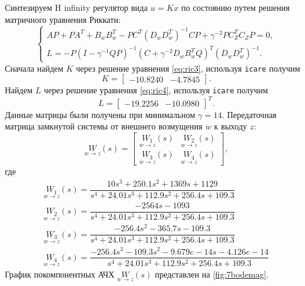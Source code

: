 Синтезируем H infinity регулятор вида $u=Kx$ по состоянию путем решения матричного
уравнения Риккати:
\begin{equation}
    \label{eq:ric4}
    \begin{cases}
        AP+PA^T+B_wB_w^T-PC^T(D_wD_w^T)^{-1}CP+\gamma^{-2}PC_Z^TC_ZP=0,\\
        L=-P(I-\gamma^{-1}QP)^{-1}(C+\gamma^{-2}D_wB_w^TQ)^T(D_wD_w^T)^{-1}.
    \end{cases}
\end{equation}
Сначала найдем $K$ через решение уравнения \eqref{eq:ric3}, используя \texttt{icare} получим
\begin{equation*}
    K=\begin{bmatrix}
        -10.8240	&-4.7845
    \end{bmatrix}.
\end{equation*}
Найдем $L$ через решение уравнения \eqref{eq:ric4}, используя \texttt{icare} получим
\begin{equation*}
    L=\begin{bmatrix}
        -19.2256&
-10.0980
    \end{bmatrix}^T.
\end{equation*}
Данные матрицы были получены при минимальном $\gamma=14$.
Передаточная матрица замкнутой системы от внешнего возмущения $w$ к выходу $z$:
\begin{equation*}
    \underset{w\rightarrow z}{W}(s)=\begin{bmatrix}
        \underset{w\rightarrow z}{W_1}(s) & \underset{w\rightarrow z}{W_2}(s)\\
        \underset{w\rightarrow z}{W_3}(s) & \underset{w\rightarrow z}{W_4}(s)
    \end{bmatrix},
\end{equation*}
где
\begin{gather*}
    \underset{w\rightarrow z}{W_1}(s)=\dfrac{ 10 s^3 + 250.1 s^2 + 1369 s + 1129}{s^4 + 24.01 s^3 + 112.9 s^2 + 256.4 s + 109.3}\\
    \underset{w\rightarrow z}{W_2}(s)=\dfrac{-2564 s - 1093}{s^4 + 24.01 s^3 + 112.9 s^2 + 256.4 s + 109.3}\\
    \underset{w\rightarrow z}{W_3}(s)=\dfrac{-256.4 s^2 - 365.7 s - 109.3}{s^4 + 24.01 s^3 + 112.9 s^2 + 256.4 s + 109.3}\\
    \underset{w\rightarrow z}{W_4}(s)=\dfrac{-256.4 s^3 - 109.3 s^2 - 9.679e-14 s - 4.126e-14}{s^4 + 24.01 s^3 + 112.9 s^2 + 256.4 s + 109.3}
\end{gather*}
График покомпонентных АЧХ $\underset{w\rightarrow z}{W}(s)$ представлен на \autoref{fig:7bodemag}.
